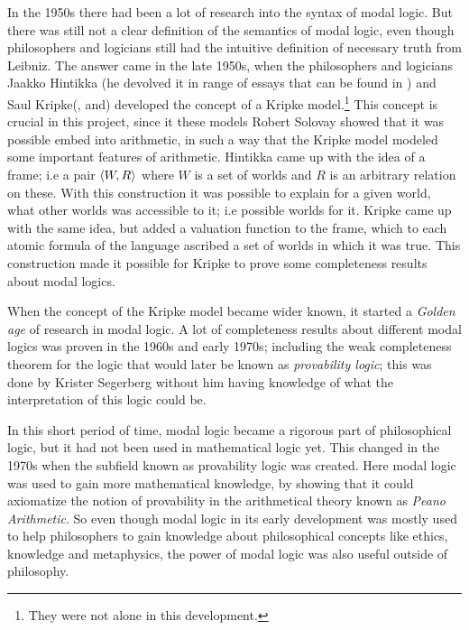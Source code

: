 \documentclass[../main.tex]{subfiles}
\begin{document}
In the 1950s there had been a lot of research into the syntax of modal logic.
But there was still not a clear definition of the semantics of modal logic,
even though philosophers and logicians still had the intuitive definition of
necessary truth from Leibniz. The answer came in the late 1950s, when the
philosophers and logicians Jaakko Hintikka (he devolved it in range of essays
that can be found in \citet{Hintikka1969})
and Saul Kripke(\citet{Kripke1959a}, \citet{Kripke1959b} and\citet{Kripke1963}) developed the concept of a Kripke model.\footnote{They were not
	alone in this development.} This concept is crucial in this project,
since it these models Robert Solovay showed that it was possible embed into
arithmetic, in such a way that the Kripke model modeled some important features
of arithmetic.
Hintikka came up with the idea of a frame; i.e a pair $\langle W,R\rangle$ where $W$ is
a set of worlds and $R$ is an arbitrary relation on these. With this
construction it was possible to explain for a given world, what other worlds
was accessible to it; i.e possible worlds for it. Kripke came up with the same
idea, but added a valuation function to the frame, which to each atomic formula of the
language ascribed a set of worlds in which it was true.  This construction made
it possible for Kripke to prove some completeness results about modal logics.


When the concept of the Kripke model became wider known, it started a
\textit{Golden age} of research in modal logic. A lot of completeness results
about different modal logics was proven in the 1960s and early 1970s; including
the weak completeness theorem for the logic that would later be known as
\textit{provability logic}; this was done by Krister Segerberg 
\parencite{Sgerberg1971} without him having
knowledge of what the interpretation of this logic could be.

In this short period of time, modal logic became a rigorous part of
philosophical logic, but it had not been used in mathematical logic yet. This
changed in the 1970s when the subfield known as provability logic was created.
Here modal logic was used to gain more mathematical knowledge, by showing that
it could axiomatize the notion of provability in the arithmetical theory known
as \textit{Peano Arithmetic}. So even though modal logic in its early development was
mostly used to help philosophers to gain knowledge about philosophical concepts
like ethics, knowledge and metaphysics, the power of modal logic was also
useful outside of philosophy.
\end{document}
